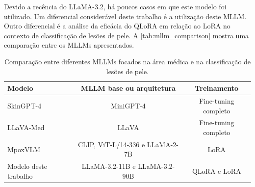 Devido a recência do \ac{LLaMA}-3.2, há poucos casos em que este modelo foi utilizado. Um diferencial considerável
deste trabalho é a utilização deste \ac{MLLM}. Outro diferencial é a análise da eficácia do \ac{QLoRA} em relação ao
\ac{LoRA} no contexto de classificação de lesões de pele. A \autoref{tab:mllm_comparison} mostra uma comparação entre
os \acp{MLLM} apresentados.

\begin{table}[ht]
    \caption{\small Comparação entre diferentes \acp{MLLM} focados na área médica e na classificação de lesões de pele.}
    \centering
    \begin{tabular}{l|cc}
        \hline
        Modelo                & MLLM base ou arquitetura                  & Treinamento            \\ \hline
        Skin\ac{GPT}-4        & Mini\ac{GPT}-4                            & Fine-tuning completo   \\
        \ac{LLaVA}-Med        & \ac{LLaVA}                                & Fine-tuning completo   \\
        MpoxVLM               & \ac{CLIP}, \ac{ViT}-L/14-336 e LLaMA-2-7B & \ac{LoRA}              \\
        Modelo deste trabalho & \ac{LLaMA}-3.2-11B e \ac{LLaMA}-3.2-90B   & \ac{QLoRA} e \ac{LoRA} \\ \hline
    \end{tabular}
    \label{tab:mllm_comparison}
\end{table}